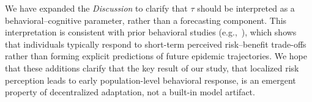 \documentclass{article}
\begin{document}
{We have expanded the \textit{Discussion} to clarify that $\tau$ should be interpreted as a behavioral–cognitive parameter, rather than a forecasting component. This interpretation is consistent with prior behavioral studies (e.g.,~\cite{fenichel2011adaptive,perrings2014merging}), 
which shows that individuals typically respond to short-term perceived risk–benefit trade-offs rather than forming explicit predictions of future epidemic trajectories.
%
We hope that these additions clarify that the key result of our study, that localized risk perception leads to early population-level behavioral response, is an emergent property of decentralized adaptation, not a built-in model artifact.
%
}


\end{document}
